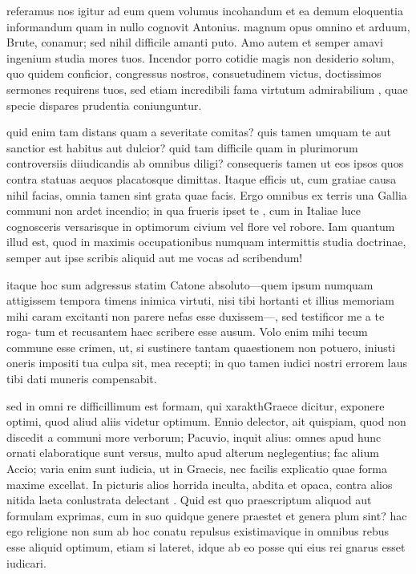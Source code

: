  referamus nos igitur ad eum quem volumus incohandum et ea demum eloquentia informandum quam in nullo cognovit Antonius. magnum opus omnino et arduum, Brute, conamur; sed nihil difficile amanti puto. Amo autem et semper amavi ingenium studia mores tuos. Incendor porro cotidie magis non desiderio solum, quo quidem conficior, congressus nostros, consuetudinem victus, doctissimos sermones requirens tuos, sed etiam incredibili fama virtutum admirabilium , quae specie dispares prudentia coniunguntur.

 quid enim tam distans quam a severitate comitas? quis tamen umquam te aut sanctior est habitus aut dulcior? quid tam difficile quam in plurimorum controversiis diiudicandis ab omnibus diligi? consequeris tamen ut eos ipsos quos contra statuas aequos placatosque dimittas. Itaque efficis ut, cum gratiae causa nihil facias, omnia tamen sint grata quae facis. Ergo omnibus ex terris una Gallia communi non ardet incendio; in qua frueris ipset te , cum in Italiae luce cognosceris versarisque in optimorum civium vel flore vel robore. Iam quantum illud est, quod in maximis occupationibus numquam intermittis studia doctrinae, semper aut ipse scribis aliquid aut me vocas ad scribendum!

 itaque hoc sum adgressus statim Catone absoluto—quem ipsum numquam attigissem tempora timens inimica virtuti, nisi tibi hortanti et illius memoriam mihi caram excitanti non parere nefas esse duxissem—, sed testificor me a te roga- tum et recusantem haec scribere esse ausum. Volo enim mihi tecum commune esse crimen, ut, si sustinere tantam quaestionem non potuero, iniusti oneris impositi tua culpa sit, mea recepti; in quo tamen iudici nostri errorem laus tibi dati muneris compensabit.

 sed in omni re difficillimum est formam, qui xarakth\r Graece dicitur, exponere optimi, quod aliud aliis videtur optimum. Ennio delector, ait quispiam, quod non discedit a communi more verborum; Pacuvio, inquit alius: omnes apud hunc ornati elaboratique sunt versus, multo apud alterum neglegentius; fac alium Accio; varia enim sunt iudicia, ut in Graecis, nec facilis explicatio quae forma maxime excellat. In picturis alios horrida inculta, abdita et opaca, contra alios nitida laeta conlustrata delectant . Quid est quo praescriptum aliquod aut formulam exprimas, cum in suo quidque genere praestet et genera plum sint? hac ego religione non sum ab hoc conatu repulsus existimavique in omnibus rebus esse aliquid optimum, etiam si lateret, idque ab eo posse qui eius rei gnarus esset iudicari.

